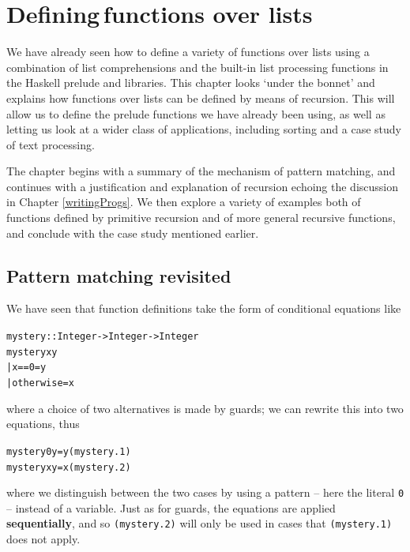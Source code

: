 %

\chapter{Defining\,functions over lists}
\chapstart
\label{defFunLists}

We have already seen how to define a variety of functions over lists using a 
combination of list comprehensions and the built-in list processing functions
in the Haskell prelude and libraries. This chapter looks `under the bonnet' and explains how 
functions over lists can be defined by means of
recursion. This will allow us  to define the prelude functions we
have already been using, as well as letting us look at a wider class of
applications, including sorting and a case study of text processing.

The chapter begins with a summary of the mechanism of pattern matching,
and continues with a justification and explanation of recursion echoing
the discussion in Chapter \ref{writingProgs}. We then explore a variety
of examples both of functions defined by primitive recursion and of more
general recursive functions, and conclude with the case study mentioned
earlier.

\begin{webvideos}
\end{webvideos}

\section{Pattern matching revisited}
\label{pattMatchRevisit}

We have seen that function definitions take the form of conditional equations like
\begin{alltt}
mystery :: Integer -> Integer -> Integer
mystery x y 
  | x==0        = y
  | otherwise   = x
\end{alltt}
where a choice of two alternatives is made by guards; we can rewrite
this into two equations, thus
\begin{alltt}
mystery 0 y = y\hfill(mystery.1)
mystery x y = x\hfill(mystery.2)
\end{alltt}
where we distinguish between the two cases by using a pattern -- here
the literal \texttt{0} -- instead of a variable. Just as for guards,
the equations are applied \textbf{sequentially}, 
and so \texttt{(mystery.2)} will only be used
in cases that \texttt{(mystery.1)} does not apply.

